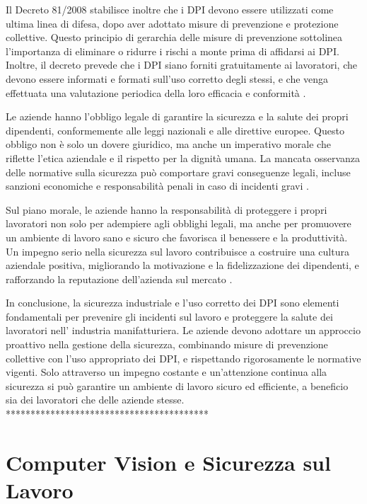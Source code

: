 Il Decreto 81/2008 stabilisce inoltre che i DPI devono essere utilizzati come ultima linea di difesa, dopo aver adottato misure di prevenzione e protezione collettive. Questo principio di gerarchia delle misure di prevenzione sottolinea l'importanza di eliminare o ridurre i rischi a monte prima di affidarsi ai DPI. Inoltre, il decreto prevede che i DPI siano forniti gratuitamente ai lavoratori, che devono essere informati e formati sull'uso corretto degli stessi, e che venga effettuata una valutazione periodica della loro efficacia e conformità \cite{decreto81}.

Le aziende hanno l'obbligo legale di garantire la sicurezza e la salute dei propri dipendenti, conformemente alle leggi nazionali e alle direttive europee. Questo obbligo non è solo un dovere giuridico, ma anche un imperativo morale che riflette l'etica aziendale e il rispetto per la dignità umana. La mancata osservanza delle normative sulla sicurezza può comportare gravi conseguenze legali, incluse sanzioni economiche e responsabilità penali in caso di incidenti gravi \cite{decreto81}.

Sul piano morale, le aziende hanno la responsabilità di proteggere i propri lavoratori non solo per adempiere agli obblighi legali, ma anche per promuovere un ambiente di lavoro sano e sicuro che favorisca il benessere e la produttività. Un impegno serio nella sicurezza sul lavoro contribuisce a costruire una cultura aziendale positiva, migliorando la motivazione e la fidelizzazione dei dipendenti, e rafforzando la reputazione dell'azienda sul mercato \cite{valoresicurezza}.

In conclusione, la sicurezza industriale e l'uso corretto dei DPI sono elementi fondamentali per prevenire gli incidenti sul lavoro e proteggere la salute dei lavoratori nell' industria manifatturiera. Le aziende devono adottare un approccio proattivo nella gestione della sicurezza, combinando misure di prevenzione collettive con l'uso appropriato dei DPI, e rispettando rigorosamente le normative vigenti. Solo attraverso un impegno costante e un'attenzione continua alla sicurezza si può garantire un ambiente di lavoro sicuro ed efficiente, a beneficio sia dei lavoratori che delle aziende stesse.
*****************************************

\section{Computer Vision e Sicurezza sul Lavoro}


